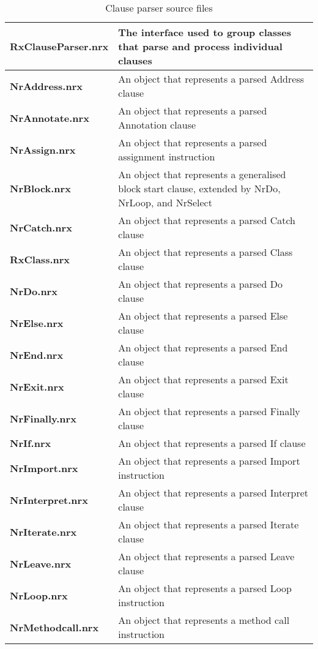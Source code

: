 \begin{table}\caption{Clause parser source files}
\begin{tabularx}{\textwidth}{>{\bfseries}lX}
    \toprule
    RxClauseParser.nrx  &The interface used to group classes that parse and process individual clauses
    \\\midrule
    NrAddress.nrx   &An object that represents a parsed Address clause
    \\\midrule
    NrAnnotate.nrx  &An object that represents a parsed Annotation clause
    \\\midrule
    NrAssign.nrx    &An object that represents a parsed assignment instruction
    \\\midrule
    NrBlock.nrx     &An object that represents a generalised block start clause, extended by NrDo, NrLoop, and NrSelect
    \\\midrule
    NrCatch.nrx     &An object that represents a parsed Catch clause
    \\\midrule
    RxClass.nrx     &An object that represents a parsed Class clause
    \\\midrule
    NrDo.nrx        &An object that represents a parsed Do clause
    \\\midrule
    NrElse.nrx      &An object that represents a parsed Else clause
    \\\midrule
    NrEnd.nrx       &An object that represents a parsed End clause
    \\\midrule
    NrExit.nrx      &An object that represents a parsed Exit clause
    \\\midrule
    NrFinally.nrx   &An object that represents a parsed Finally clause
    \\\midrule
    NrIf.nrx        &An object that represents a parsed If clause
    \\\midrule
    NrImport.nrx    &An object that represents a parsed Import instruction
    \\\midrule
    NrInterpret.nrx &An object that represents a parsed Interpret clause
    \\\midrule
    NrIterate.nrx   &An object that represents a parsed Iterate clause
    \\\midrule
    NrLeave.nrx     &An object that represents a parsed Leave clause
    \\\midrule
    NrLoop.nrx      &An object that represents a parsed Loop instruction
    \\\midrule
    NrMethodcall.nrx    &An object that represents a method call instruction

\end{tabularx}
\end{table}

